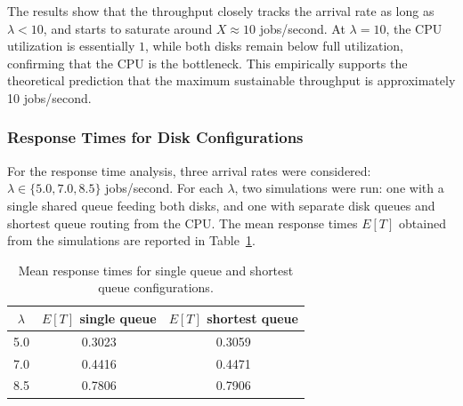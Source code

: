 \documentclass[a4paper,10pt]{article}
\begin{document}
The results show that the throughput closely tracks the arrival rate as long as $\lambda < 10$, and starts to saturate around $X \approx 10$ jobs/second. At $\lambda = 10$, the CPU utilization is essentially $1$, while both disks remain below full utilization, confirming that the CPU is the bottleneck. This empirically supports the theoretical prediction that the maximum sustainable throughput is approximately 10 jobs/second. 

\subsubsection{Response Times for Disk Configurations}

For the response time analysis, three arrival rates were considered: $\lambda \in \{5.0, 7.0, 8.5\}$ jobs/second. For each $\lambda$, two simulations were run: one with a single shared queue feeding both disks, and one with separate disk queues and shortest queue routing from the CPU. The mean response times $E[T]$ obtained from the simulations are reported in Table~\ref{tab:resp_times}. 

\begin{table}[ht]
  \centering
  \caption{Mean response times for single queue and shortest queue configurations.}
  \label{tab:resp_times}
  \begin{tabular}{c c c}
    \hline
    $\lambda$ & $E[T]$ single queue & $E[T]$ shortest queue \\
    \hline
    5.0 & 0.3023 & 0.3059 \\
    7.0 & 0.4416 & 0.4471 \\
    8.5 & 0.7806 & 0.7906 \\
    \hline
  \end{tabular}
\end{table}
\end{document}
